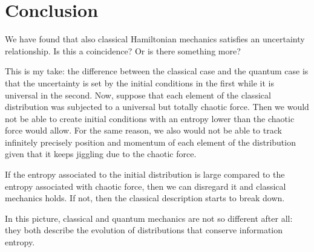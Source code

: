 \documentclass[aps,pra,10pt,floatfix,nofootinbib]{revtex4-1}
\theoremstyle{definition}
\begin{document}
\section{Conclusion}

We have found that also classical Hamiltonian mechanics satisfies an uncertainty relationship. Is this a coincidence? Or is there something more?

This is my take: the difference between the classical case and the quantum case is that the uncertainty is set by the initial conditions in the first while it is universal in the second. Now, suppose that each element of the classical distribution was subjected to a universal but totally chaotic force. Then we would not be able to create initial conditions with an entropy lower than the chaotic force would allow. For the same reason, we also would not be able to track infinitely precisely position and momentum of each element of the distribution given that it keeps jiggling due to the chaotic force.

If the entropy associated to the initial distribution is large compared to the entropy associated with chaotic force, then we can disregard it and classical mechanics holds. If not, then the classical description starts to break down.

In this picture, classical and quantum mechanics are not so different after all: they both describe the evolution of distributions that conserve information entropy.
\end{document}
